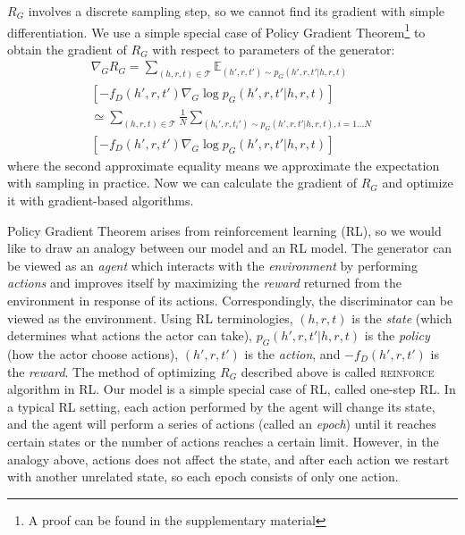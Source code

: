 \documentclass[11pt,a4paper]{article}
\begin{document}
$R_G$ involves a discrete sampling step, so we cannot find its gradient with simple differentiation. We use a simple special case of Policy Gradient Theorem\footnote{A proof can be found in the supplementary material} \cite{policygradient} to obtain the gradient of $R_G$ with respect to parameters of the generator:
\begin{multline}
\nabla_G R_G=\sum_{(h,r,t)\in\mathcal{T}}\mathbb{E}_{(h',r,t')\sim p_G(h',r,t'|h,r,t)} \\
[-f_D(h',r,t')\nabla_G \log p_G(h',r,t'|h,r,t)] \\
\simeq \sum_{(h,r,t)\in\mathcal{T}}\frac{1}{N}\sum_{(h_i',r,t_i')\sim p_G(h',r,t'|h,r,t), i=1\dots N} \\
[-f_D(h',r,t')\nabla_G \log p_G(h',r,t'|h,r,t)]
\end{multline}
where the second approximate equality means we approximate the expectation with sampling in practice. Now we can calculate the gradient of $R_G$ and optimize it with gradient-based algorithms.

Policy Gradient Theorem arises from reinforcement learning (RL), so we would like to draw an analogy between our model and an RL model. The generator can be viewed as an \emph{agent} which interacts with the \emph{environment} by performing \emph{actions} and improves itself by maximizing the \emph{reward} returned from the environment in response of its actions. Correspondingly, the discriminator can be viewed as the environment. Using RL terminologies, $(h,r,t)$ is the \emph{state} (which determines what actions the actor can take), $p_G(h',r,t'|h,r,t)$ is the \emph{policy} (how the actor choose actions), $(h',r,t')$ is the \emph{action}, and $-f_D(h',r,t')$ is the \emph{reward}. The method of optimizing $R_G$ described above is called \textsc{reinforce}~\cite{williams1992simple} algorithm in RL. Our model is a simple special case of RL, called one-step RL. In a typical RL setting, each action performed by the agent will change its state, and the agent will perform a series of actions (called an \emph{epoch}) until it reaches certain states or the number of actions reaches a certain limit. However, in the analogy above, actions does not affect the state, and after each action we restart with another unrelated state, so each epoch consists of only one action.
\end{document}
